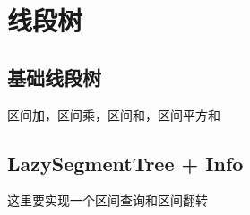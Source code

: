 \section{线段树}
\subsection{基础线段树}


区间加，区间乘，区间和，区间平方和


\subsection{LazySegmentTree + Info}
这里要实现一个区间查询和区间翻转
